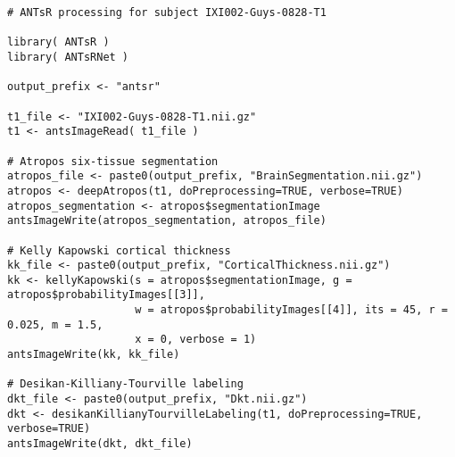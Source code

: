 \begin{lstlisting}
# ANTsR processing for subject IXI002-Guys-0828-T1

library( ANTsR )
library( ANTsRNet )

output_prefix <- "antsr"

t1_file <- "IXI002-Guys-0828-T1.nii.gz"
t1 <- antsImageRead( t1_file )

# Atropos six-tissue segmentation
atropos_file <- paste0(output_prefix, "BrainSegmentation.nii.gz")
atropos <- deepAtropos(t1, doPreprocessing=TRUE, verbose=TRUE)
atropos_segmentation <- atropos$segmentationImage
antsImageWrite(atropos_segmentation, atropos_file)

# Kelly Kapowski cortical thickness
kk_file <- paste0(output_prefix, "CorticalThickness.nii.gz")
kk <- kellyKapowski(s = atropos$segmentationImage, g = atropos$probabilityImages[[3]],
                    w = atropos$probabilityImages[[4]], its = 45, r = 0.025, m = 1.5,
                    x = 0, verbose = 1)
antsImageWrite(kk, kk_file)

# Desikan-Killiany-Tourville labeling
dkt_file <- paste0(output_prefix, "Dkt.nii.gz")
dkt <- desikanKillianyTourvilleLabeling(t1, doPreprocessing=TRUE, verbose=TRUE)
antsImageWrite(dkt, dkt_file)
\end{lstlisting}



